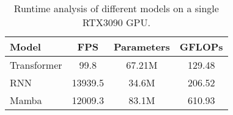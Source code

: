 \begin{table}[t]
\footnotesize
\centering
\begin{adjustbox}{width=1\columnwidth}
\begin{tabular}{lccc}
\toprule
Model & FPS & Parameters & GFLOPs \\
\midrule
Transformer & 99.8 & 67.21M & 129.48 \\
RNN & 13939.5 & 34.6M & 206.52 \\
Mamba & 12009.3 & 83.1M & 610.93 \\
\bottomrule
\end{tabular}
\end{adjustbox}
\caption{Runtime analysis of different models on a single RTX3090 GPU.}
\vspace*{-0.5em} 
\label{tab:fps}
\end{table}
